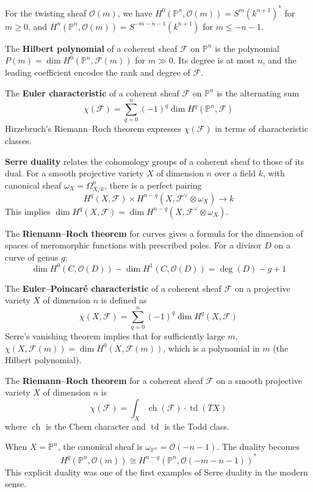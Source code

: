 For the twisting sheaf $\mathcal{O}(m)$, we have $H^0(\mathbb{P}^n, \mathcal{O}(m)) = S^m(k^{n+1})^*$ for $m \geq 0$, and $H^n(\mathbb{P}^n, \mathcal{O}(m)) = S^{-m-n-1}(k^{n+1})$ for $m \leq -n-1$.

The \textbf{Hilbert polynomial} of a coherent sheaf $\mathcal{F}$ on $\mathbb{P}^n$ is the polynomial $P(m) = \dim H^0(\mathbb{P}^n, \mathcal{F}(m))$ for $m \gg 0$. Its degree is at most $n$, and the leading coefficient encodes the rank and degree of $\mathcal{F}$.

The \textbf{Euler characteristic} of a coherent sheaf $\mathcal{F}$ on $\mathbb{P}^n$ is the alternating sum
\[\chi(\mathcal{F}) = \sum_{q=0}^n (-1)^q \dim H^q(\mathbb{P}^n, \mathcal{F})\]
Hirzebruch's Riemann--Roch theorem expresses $\chi(\mathcal{F})$ in terms of characteristic classes.

\textbf{Serre duality} relates the cohomology groups of a coherent sheaf to those of its dual. For a smooth projective variety $X$ of dimension $n$ over a field $k$, with canonical sheaf $\omega_X = \Omega^n_{X/k}$, there is a perfect pairing
\[H^q(X, \mathcal{F}) \times H^{n-q}(X, \mathcal{F}^\vee \otimes \omega_X) \to k\]
This implies $\dim H^q(X, \mathcal{F}) = \dim H^{n-q}(X, \mathcal{F}^\vee \otimes \omega_X)$.

The \textbf{Riemann--Roch theorem} for curves gives a formula for the dimension of spaces of meromorphic functions with prescribed poles. For a divisor $D$ on a curve of genus $g$:
\[\dim H^0(C, \mathcal{O}(D)) - \dim H^1(C, \mathcal{O}(D)) = \deg(D) - g + 1\]

The \textbf{Euler--Poincaré characteristic} of a coherent sheaf $\mathcal{F}$ on a projective variety $X$ of dimension $n$ is defined as
\[\chi(X, \mathcal{F}) = \sum_{q=0}^n (-1)^q \dim H^q(X, \mathcal{F})\]
Serre's vanishing theorem implies that for sufficiently large $m$, $\chi(X, \mathcal{F}(m)) = \dim H^0(X, \mathcal{F}(m))$, which is a polynomial in $m$ (the Hilbert polynomial).

The \textbf{Riemann--Roch theorem} for a coherent sheaf $\mathcal{F}$ on a smooth projective variety $X$ of dimension $n$ is
\[\chi(\mathcal{F}) = \int_X \operatorname{ch}(\mathcal{F}) \cdot \operatorname{td}(TX)\]
where $\operatorname{ch}$ is the Chern character and $\operatorname{td}$ is the Todd class.

When $X = \mathbb{P}^n$, the canonical sheaf is $\omega_{\mathbb{P}^n} = \mathcal{O}(-n-1)$. The duality becomes
\[H^q(\mathbb{P}^n, \mathcal{O}(m)) \cong H^{n-q}(\mathbb{P}^n, \mathcal{O}(-m-n-1))^*\]
This explicit duality was one of the first examples of Serre duality in the modern sense.


